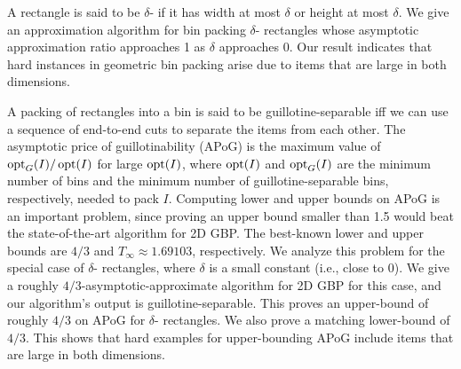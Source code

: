 A rectangle is said to be $\delta$-\thin{} if it has
width at most $\delta$ or height at most $\delta$.
We give an approximation algorithm for bin packing $\delta$-\thin{} rectangles
whose asymptotic approximation ratio approaches 1 as $\delta$ approaches 0.
Our result indicates that hard instances in geometric bin packing arise due to
items that are large in both dimensions.

A packing of rectangles into a bin is said to be guillotine-separable iff
we can use a sequence of end-to-end cuts to separate the items from each other.
The asymptotic price of guillotinability (APoG) is the maximum
value of $\operatorname{opt}_G(I)/\operatorname{opt}(I)$ for large $\operatorname{opt}(I)$, where
$\operatorname{opt}(I)$ and $\operatorname{opt}_G(I)$ are the minimum number of bins and
the minimum number of guillotine-separable bins, respectively, needed to pack $I$.
Computing lower and upper bounds on APoG is an important problem,
since proving an upper bound smaller than 1.5 would beat
the state-of-the-art algorithm for 2D GBP.
The best-known lower and upper bounds are
$4/3$ and \texorpdfstring{$T_{\infty} \approx 1.69103$}{1.69104}, respectively.
We analyze this problem for the special case of $\delta$-\thin{} rectangles,
where $\delta$ is a small constant (i.e., close to 0).
We give a roughly $4/3$-asymptotic-approximate algorithm for
2D GBP for this case, and our algorithm's output is guillotine-separable.
This proves an upper-bound of roughly $4/3$ on APoG for $\delta$-\thin{} rectangles.
We also prove a matching lower-bound of $4/3$.
This shows that hard examples for upper-bounding APoG
include items that are large in both dimensions.
